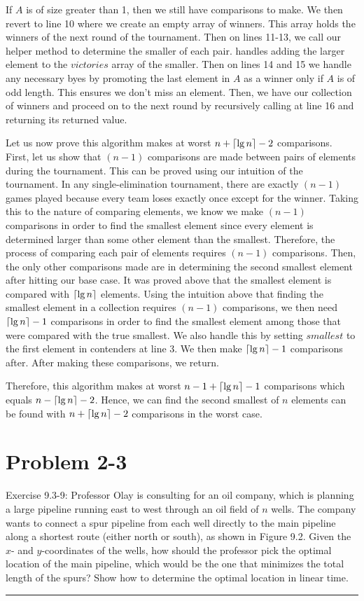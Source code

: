 \documentclass[11pt]{article}
\def\separateline{\medskip\hrule\medskip}
\DeclarePairedDelimiter{\ceil}{\lceil}{\rceil}
\begin{document}
If $A$ is of size greater than 1, then we still have comparisons to make. We then revert to line 10 where we create an empty array of winners. This array holds the winners of the next round of the tournament. Then on lines 11-13, we call our helper method  to determine the smaller of each pair.  handles adding the larger element to the $victories$ array of the smaller. Then on lines 14 and 15 we handle any necessary byes by promoting the last element in $A$ as a winner only if $A$ is of odd length. This ensures we don't miss an element. Then, we have our collection of winners and proceed on to the next round by recursively calling  at line 16 and returning its returned value.

Let us now prove this algorithm makes at worst $n + \ceil{\lg{n}} - 2$ comparisons. First, let us show that $(n-1)$ comparisons are made between pairs of elements during the tournament. This can be proved using our intuition of the tournament. In any single-elimination tournament, there are exactly $(n-1)$ games played because every team loses exactly once except for the winner. Taking this to the nature of comparing elements, we know we make $(n-1)$ comparisons in order to find the smallest element since every element is determined larger than some other element than the smallest. Therefore, the process of comparing each pair of elements requires $(n-1)$ comparisons. Then, the only other comparisons made are in determining the second smallest element after hitting our base case. It was proved above that the smallest element is compared with $\ceil{\lg{n}}$ elements. Using the intuition above that finding the smallest element in a collection requires $(n-1)$ comparisons, we then need $\ceil{\lg{n}} - 1$ comparisons in order to find the smallest element among those that were compared with the true smallest. We also handle this by setting $smallest$ to the first element in contenders at line 3. We then make $\ceil{\lg{n}} - 1$  comparisons after. After making these comparisons, we return.

Therefore, this algorithm makes at worst $n - 1 + \ceil{\lg{n}} - 1$ comparisons which equals $n - \ceil{\lg{n}} - 2$. Hence, we can find the second smallest of $n$ elements can be found with $n + \ceil{\lg{n}} - 2$ comparisons in the worst case.

\newpage

\section{Problem 2-3}
Exercise 9.3-9: Professor Olay is consulting for an oil company, which is planning a large pipeline running east to west through an oil field of $n$ wells. The company wants to connect a spur pipeline from each well directly to the main pipeline along a shortest route (either north or south), as shown in Figure 9.2. Given the $x$- and $y$-coordinates of the wells, how should the professor pick the optimal location of the main pipeline, which would be the one that minimizes the total length of the spurs? Show how to determine the optimal location in linear time.
\separateline
\end{document}
